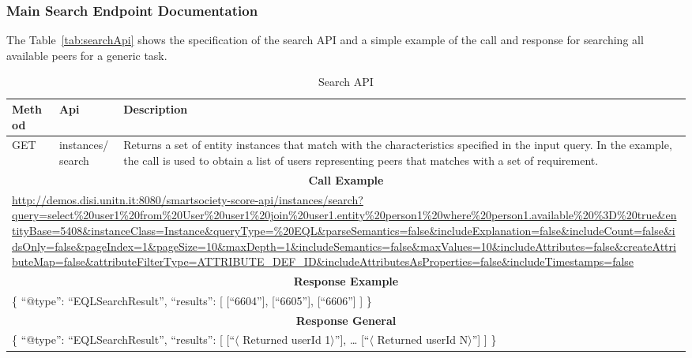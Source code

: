 \subsubsection{Main Search Endpoint Documentation}

The Table~\ref{tab:searchApi} shows the specification of the search API and a simple example of the call and response for searching all available peers for a generic task. 

\begin{table}[htdp]
\caption{Search API}
\begin{center}

\begin{tabular}{|l|l|p{9cm}|}
\hline
\textbf{Method} & \textbf{Api} & \textbf{Description} \\
\hline
GET & 
instances/search & 
Returns a set of entity instances that match with the characteristics specified in the input query. In the example, the call is used to obtain a list of users representing peers that matches with a set of requirement. \\
\hline
\multicolumn{3}{|c|}{\textbf{Call Example}} \\
\hline
\multicolumn{3}{|p{14cm}|}{
\url{
http://demos.disi.unitn.it:8080/smartsociety-score-api/instances/search?query=select\%20user1\%20from\%20User\%20user1\%20join\%20user1.entity\%20person1\%20where\%20person1.available\%20\%3D\%20true\&entityBase=5408\&instanceClass=Instance\&queryType=\%20EQL\&parseSemantics=false\&includeExplanation=false\&includeCount=false\&idsOnly=false\&pageIndex=1\&pageSize=10\&maxDepth=1\&includeSemantics=false\&maxValues=10\&includeAttributes=false\&createAttributeMap=false\&attributeFilterType=ATTRIBUTE\_DEF\_ID\&includeAttributesAsProperties=false\&includeTimestamps=false
}}
\\ 
\hline
\multicolumn{3}{|c|}{\textbf{Response Example}} \\
\hline
\multicolumn{3}{|p{14cm}|}{
\{
  ``@type'': ``EQLSearchResult'',
  ``results'': [
      [``6604''],
      [``6605''],
      [``6606'']
  ]
\}
} \\
\hline
\multicolumn{3}{|c|}{\textbf{Response General}} \\
\hline
\multicolumn{3}{|p{14cm}|}{
\{
  ``@type'': ``EQLSearchResult'',
  ``results'': [
      [``\textcolor{ao(english)}{$\langle$ Returned userId 1$\rangle$}''],
      \textcolor{ao(english)}{\ldots}
      [``\textcolor{ao(english)}{$\langle$ Returned userId N$\rangle$}'']
  ]
\}
} \\
\hline



\end{tabular}
\end{center}
\end{table}
